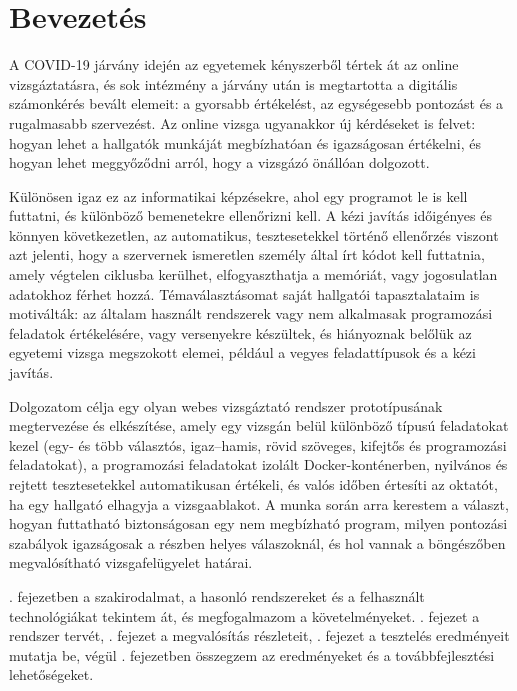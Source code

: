 \chapter{Bevezetés}
\label{ch:bevezetes}

A COVID-19 járvány idején az egyetemek kényszerből tértek át az online vizsgáztatásra, és sok
intézmény a járvány után is megtartotta a digitális számonkérés bevált elemeit: a gyorsabb
értékelést, az egységesebb pontozást és a rugalmasabb szervezést. Az online vizsga ugyanakkor új
kérdéseket is felvet: hogyan lehet a hallgatók munkáját megbízhatóan és igazságosan értékelni, és
hogyan lehet meggyőződni arról, hogy a vizsgázó önállóan dolgozott.

Különösen igaz ez az informatikai képzésekre, ahol egy programot le is kell futtatni, és
különböző bemenetekre ellenőrizni kell. A kézi javítás időigényes és könnyen következetlen, az
automatikus, tesztesetekkel történő ellenőrzés viszont azt jelenti, hogy a szervernek ismeretlen
személy által írt kódot kell futtatnia, amely végtelen ciklusba kerülhet, elfogyaszthatja a
memóriát, vagy jogosulatlan adatokhoz férhet hozzá. Témaválasztásomat saját hallgatói
tapasztalataim is motiválták: az általam használt rendszerek vagy nem alkalmasak programozási
feladatok értékelésére, vagy versenyekre készültek, és hiányoznak belőlük az egyetemi vizsga
megszokott elemei, például a vegyes feladattípusok és a kézi javítás.

Dolgozatom célja egy olyan webes vizsgáztató rendszer prototípusának megtervezése és
elkészítése, amely egy vizsgán belül különböző típusú feladatokat kezel (egy- és több
választós, igaz--hamis, rövid szöveges, kifejtős és programozási feladatokat), a programozási
feladatokat izolált Docker-konténerben, nyilvános és rejtett tesztesetekkel automatikusan
értékeli, és valós időben értesíti az oktatót, ha egy hallgató elhagyja a vizsgaablakot. A munka
során arra kerestem a választ, hogyan futtatható biztonságosan egy nem megbízható program, milyen
pontozási szabályok igazságosak a részben helyes válaszoknál, és hol vannak a böngészőben
megvalósítható vizsgafelügyelet határai.

. fejezetben a szakirodalmat, a hasonló rendszereket és a felhasznált
technológiákat tekintem át, és megfogalmazom a követelményeket. . fejezet a
rendszer tervét, . fejezet a megvalósítás részleteit,
. fejezet a tesztelés eredményeit mutatja be, végül .
fejezetben összegzem az eredményeket és a továbbfejlesztési lehetőségeket.
